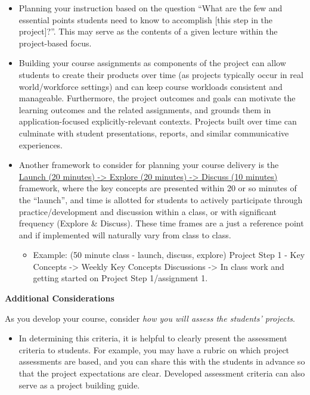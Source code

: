 \documentclass[
  letterpaper,
  DIV=11,
  numbers=noendperiod]{scrreprt}
\providecommand{\tightlist}{%
  \setlength{\itemsep}{0pt}\setlength{\parskip}{0pt}}
\begin{document}
\begin{itemize}
\item
  Planning your instruction based on the question ``What are the few and
  essential points students need to know to accomplish {[}this step in
  the project{]}?''. This may serve as the contents of a given lecture
  within the project-based focus.
\item
  Building your course assignments as components of the project can
  allow students to create their products over time (as projects
  typically occur in real world/workforce settings) and can keep course
  workloads consistent and manageable. Furthermore, the project outcomes
  and goals can motivate the learning outcomes and the related
  assignments, and grounds them in application-focused
  explicitly-relevant contexts. Projects built over time can culminate
  with student presentations, reports, and similar communicative
  experiences.
\item
  Another framework to consider for planning your course delivery is the
  \href{https://drive.google.com/file/d/13AwDhsoMFh31YdHoxdP_5FaaqUdqkM1W/view}{Launch
  (20 minutes) -\textgreater{} Explore (20 minutes) -\textgreater{}
  Discuss (10 minutes)} framework, where the key concepts are presented
  within 20 or so minutes of the ``launch'', and time is allotted for
  students to actively participate through practice/development and
  discussion within a class, or with significant frequency (Explore \&
  Discuss). These time frames are a just a reference point and if
  implemented will naturally vary from class to class.

  \begin{itemize}
  \tightlist
  \item
    Example: (50 minute class - launch, discuss, explore) Project Step 1
    - Key Concepts -\textgreater{} Weekly Key Concepts Discussions
    -\textgreater{} In class work and getting started on Project Step
    1/assignment 1.
  \end{itemize}
\end{itemize}

\textbf{Additional Considerations}

As you develop your course, consider \emph{how you will assess the
students' projects}.

\begin{itemize}
\tightlist
\item
  In determining this criteria, it is helpful to clearly present the
  assessment criteria to students. For example, you may have a rubric on
  which project assessments are based, and you can share this with the
  students in advance so that the project expectations are clear.
  Developed assessment criteria can also serve as a project building
  guide.
\end{itemize}
\end{document}
